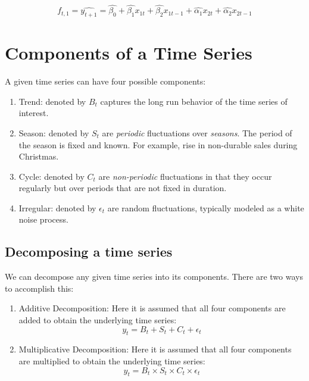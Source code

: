 \documentclass[]{book}
\theoremstyle{definition}
\theoremstyle{definition}
\theoremstyle{definition}
\theoremstyle{remark}
\begin{document}
\begin{equation}
f_{t,1}=\widehat{y_{t+1}}=\hat{\beta_0}+\hat{\beta_1}x_{1t} + \hat{\beta_2}x_{1t-1}+ \hat{\alpha_1}x_{2t}+\hat{\alpha_2}x_{2t-1}
\end{equation}

\hypertarget{components-of-a-time-series}{%
\chapter{Components of a Time Series}\label{components-of-a-time-series}}

A given time series can have four possible components:

\begin{enumerate}
\def\labelenumi{\arabic{enumi}.}
\item
  Trend: denoted by \(B_t\) captures the long run behavior of the time series of interest.
\item
  Season: denoted by \(S_t\) are \emph{periodic} fluctuations over \emph{seasons}. The period of the season is fixed and known. For example, rise in non-durable sales during Christmas.
\item
  Cycle: denoted by \(C_t\) are \emph{non-periodic} fluctuations in that they occur regularly but over periods that are not fixed in duration.
\item
  Irregular: denoted by \(\epsilon_t\) are random fluctuations, typically modeled as a white noise process.
\end{enumerate}

\hypertarget{decomposing-a-time-series}{%
\section{Decomposing a time series}\label{decomposing-a-time-series}}

We can decompose any given time series into its components. There are two ways to accomplish this:

\begin{enumerate}
\def\labelenumi{\arabic{enumi}.}
\item
  Additive Decomposition: Here it is assumed that all four components are added to obtain the underlying time series:
  \begin{equation}
  y_t= B_t+S_t+C_t +\epsilon_t
  \end{equation}
\item
  Multiplicative Decomposition: Here it is assumed that all four components are multiplied to obtain the underlying time series:
  \begin{equation}
  y_t= B_t \times S_t \times C_t \times \epsilon_t
  \end{equation}
\end{enumerate}
\end{document}
